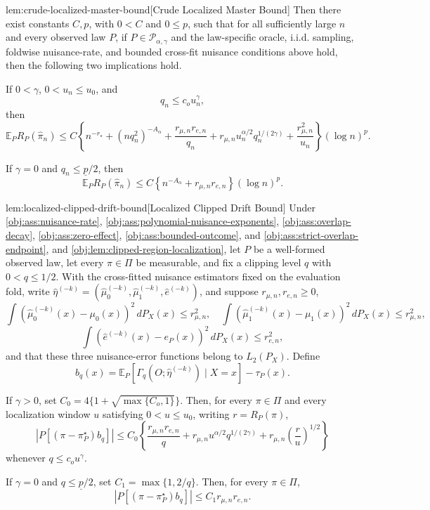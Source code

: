 \begin{lemmav}{lem:crude-localized-master-bound}[Crude Localized Master Bound]
Then there exist constants \(C,p\), with \(0<C\) and \(0\le p\), such that for all sufficiently large \(n\) and every observed law \(P\), if \(P\in\mathcal P_{\alpha,\gamma}\) and the law-specific oracle, i.i.d. sampling, foldwise nuisance-rate, and bounded cross-fit nuisance conditions above hold, then the following two implications hold.

If \(0<\gamma\), \(0<u_n\le u_0\), and
\[
q_n\le c_o u_n^\gamma,
\]
then
\[
\mathbb E_P R_P(\widehat\pi_n)
\le
C\left\{
n^{-r_\star}
+(nq_n^2)^{-A_\alpha}
+\frac{r_{\mu,n}r_{e,n}}{q_n}
+r_{\mu,n}u_n^{\alpha/2}q_n^{1/(2\gamma)}
+\frac{r_{\mu,n}^2}{u_n}
\right\}(\log n)^p .
\]

If \(\gamma=0\) and \(q_n\le \underline p/2\), then
\[
\mathbb E_P R_P(\widehat\pi_n)
\le
C\left\{
n^{-A_\alpha}+r_{\mu,n}r_{e,n}
\right\}(\log n)^p .
\]
\end{lemmav}

\begin{lemmav}{lem:localized-clipped-drift-bound}[Localized Clipped Drift Bound]
Under \cref{obj:ass:nuisance-rate}, \cref{obj:ass:polynomial-nuisance-exponents}, \cref{obj:ass:overlap-decay}, \cref{obj:ass:zero-effect}, \cref{obj:ass:bounded-outcome}, and \cref{obj:ass:strict-overlap-endpoint}, and \cref{obj:lem:clipped-region-localization}, let \(P\) be a well-formed observed law, let every \(\pi\in\Pi\) be measurable, and fix a clipping level \(q\) with \(0<q\le 1/2\).  With the cross-fitted nuisance estimators fixed on the evaluation fold, write \(\widehat\eta^{(-k)}=(\widehat\mu_0^{(-k)},\widehat\mu_1^{(-k)},\widehat e^{(-k)})\), and suppose \(r_{\mu,n},r_{e,n}\ge0\),
\[
\int (\widehat\mu_0^{(-k)}(x)-\mu_0(x))^2\,dP_X(x)\le r_{\mu,n}^2,
\quad
\int (\widehat\mu_1^{(-k)}(x)-\mu_1(x))^2\,dP_X(x)\le r_{\mu,n}^2,
\]
\[
\int (\widehat e^{(-k)}(x)-e_P(x))^2\,dP_X(x)\le r_{e,n}^2,
\]
and that these three nuisance-error functions belong to \(L_2(P_X)\).  Define
\[
b_q(x)
=
\mathbb E_P\!\left[\Gamma_q(O;\widehat\eta^{(-k)})\mid X=x\right]
-
\tau_P(x).
\]

If \(\gamma>0\), set \(C_0=4\{1+\sqrt{\max\{C_o,1\}}\}\).  Then, for every \(\pi\in\Pi\) and every localization window \(u\) satisfying \(0<u\le u_0\), writing \(r=R_P(\pi)\),
\[
\left|P\!\left[(\pi-\pi^\star_P)b_q\right]\right|
\le
C_0\left\{
\frac{r_{\mu,n}r_{e,n}}{q}
+
r_{\mu,n}u^{\alpha/2}q^{1/(2\gamma)}
+
r_{\mu,n}\left(\frac{r}{u}\right)^{1/2}
\right\}
\]
whenever \(q\le c_o u^\gamma\).

If \(\gamma=0\) and \(q\le \underline p/2\), set \(C_1=\max\{1,2/q\}\).  Then, for every \(\pi\in\Pi\),
\[
\left|P\!\left[(\pi-\pi^\star_P)b_q\right]\right|
\le
C_1 r_{\mu,n}r_{e,n}.
\]
\end{lemmav}
